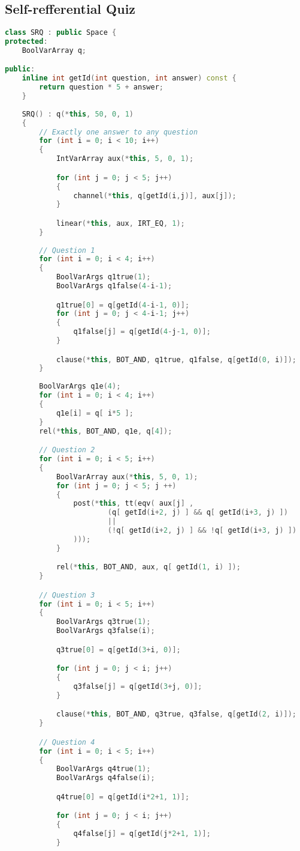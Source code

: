 \subsection{Self-refferential Quiz}
\label{implementation:gecode:srq}
\begin{lstlisting}[language=C++]
class SRQ : public Space {
protected: 
	BoolVarArray q;

public:
	inline int getId(int question, int answer) const {
		return question * 5 + answer;
	}
	
	SRQ() : q(*this, 50, 0, 1)
	{
		// Exactly one answer to any question
		for (int i = 0; i < 10; i++)
		{
			IntVarArray aux(*this, 5, 0, 1);

			for (int j = 0; j < 5; j++)
			{
				channel(*this, q[getId(i,j)], aux[j]);
			}

			linear(*this, aux, IRT_EQ, 1);
		}
		
		// Question 1
		for (int i = 0; i < 4; i++)
		{
			BoolVarArgs q1true(1);
			BoolVarArgs q1false(4-i-1);

			q1true[0] = q[getId(4-i-1, 0)];
			for (int j = 0; j < 4-i-1; j++)
			{
				q1false[j] = q[getId(4-j-1, 0)];
			}

			clause(*this, BOT_AND, q1true, q1false, q[getId(0, i)]);
		}
		
		BoolVarArgs q1e(4);
		for (int i = 0; i < 4; i++)
		{
			q1e[i] = q[ i*5 ];
		}
		rel(*this, BOT_AND, q1e, q[4]);

		// Question 2
		for (int i = 0; i < 5; i++)
		{
			BoolVarArray aux(*this, 5, 0, 1);
			for (int j = 0; j < 5; j ++)
			{
				post(*this, tt(eqv( aux[j] , 
						(q[ getId(i+2, j) ] && q[ getId(i+3, j) ])
						||
						(!q[ getId(i+2, j) ] && !q[ getId(i+3, j) ])
				)));
			}

			rel(*this, BOT_AND, aux, q[ getId(1, i) ]);
		}

		// Question 3
		for (int i = 0; i < 5; i++)
		{
			BoolVarArgs q3true(1);
			BoolVarArgs q3false(i);

			q3true[0] = q[getId(3+i, 0)];

			for (int j = 0; j < i; j++)
			{
				q3false[j] = q[getId(3+j, 0)];
			}

			clause(*this, BOT_AND, q3true, q3false, q[getId(2, i)]);
		}

		// Question 4
		for (int i = 0; i < 5; i++)
		{
			BoolVarArgs q4true(1);
			BoolVarArgs q4false(i);

			q4true[0] = q[getId(i*2+1, 1)];

			for (int j = 0; j < i; j++)
			{
				q4false[j] = q[getId(j*2+1, 1)];
			}


\end{lstlisting}
